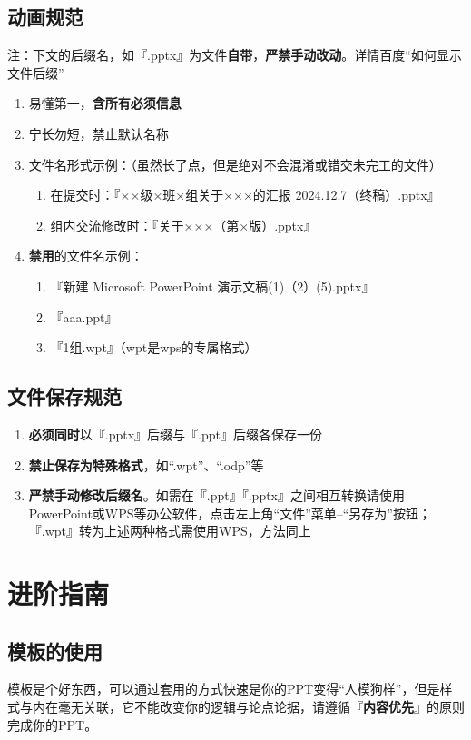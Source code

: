 \subsection[动画规范]{动画规范}
注：下文的后缀名，如『.pptx』为文件\textbf{自带}，\textbf{严禁手动改动}。详情百度“如何显示文件后缀”
\begin{enumerate}
    \item 易懂第一，\textbf{含所有必须信息}
    \item 宁长勿短，禁止默认名称
    \item 文件名形式示例：（虽然长了点，但是绝对不会混淆或错交未完工的文件）
          \begin{enumerate}
              \item 在提交时：『××级×班×组关于×××的汇报 2024.12.7（终稿）.pptx』
              \item 组内交流修改时：『关于×××（第×版）.pptx』
          \end{enumerate}
    \item \textbf{禁用}的文件名示例：
          \begin{enumerate}
              \item 『新建 Microsoft PowerPoint 演示文稿(1)（2）(5).pptx』
              \item 『aaa.ppt』
              \item 『1组.wpt』（wpt是wps的专属格式）
          \end{enumerate}
\end{enumerate}

\subsection[文件保存规范]{文件保存规范}
\begin{enumerate}
    \item \textbf{必须同时}以『.pptx』后缀与『.ppt』后缀各保存一份
    \item \textbf{禁止保存为特殊格式}，如“.wpt”、“.odp”等
    \item \textbf{严禁手动修改后缀名}。如需在『.ppt』『.pptx』之间相互转换请使用PowerPoint或WPS等办公软件，点击左上角“文件”菜单--“另存为”按钮；『.wpt』转为上述两种格式需使用WPS，方法同上
\end{enumerate}

\section[进阶指南]{进阶指南}
\subsection[模板的使用]{模板的使用}
模板是个好东西，可以通过套用的方式快速是你的PPT变得“人模狗样”，但是样式与内在毫无关联，它不能改变你的逻辑与论点论据，请遵循『\textbf{内容优先}』的原则完成你的PPT。


